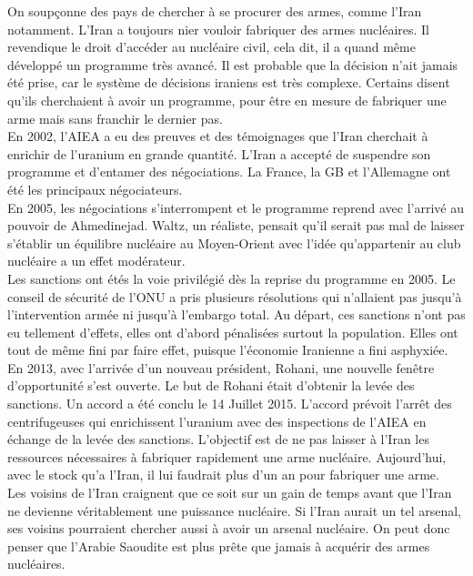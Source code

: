 \documentclass[10pt, a4paper, openany]{book}
\begin{document}
On soupçonne des pays de chercher à se procurer des armes, comme l'Iran notamment. L'Iran a toujours nier vouloir fabriquer des armes nucléaires. Il revendique le droit d'accéder au nucléaire civil, cela dit, il a quand même développé un programme très avancé. Il est probable que la décision n'ait jamais été prise, car le système de décisions iraniens est très complexe. Certains disent qu'ils cherchaient à avoir un programme, pour être en mesure de fabriquer une arme mais sans franchir le dernier pas. \\
En 2002, l'AIEA a eu des preuves et des témoignages que l'Iran cherchait à enrichir de l'uranium en grande quantité. L'Iran a accepté de suspendre son programme et d'entamer des négociations. La France, la GB et l'Allemagne ont été les principaux négociateurs. \\
En 2005, les négociations s'interrompent et le programme reprend avec l'arrivé au pouvoir de Ahmedinejad. Waltz, un réaliste, pensait qu'il serait pas mal de laisser s'établir un équilibre nucléaire au Moyen-Orient avec l'idée qu'appartenir au club nucléaire a un effet modérateur. \\
Les sanctions ont étés la voie privilégié dès la reprise du programme en 2005. Le conseil de sécurité de l'ONU a pris plusieurs résolutions qui n'allaient pas jusqu'à l'intervention armée ni jusqu'à l'embargo total. Au départ, ces sanctions n'ont pas eu tellement d'effets, elles ont d'abord pénalisées surtout la population. Elles ont tout de même fini par faire effet, puisque l'économie Iranienne a fini asphyxiée. \\
En 2013, avec l'arrivée d'un nouveau président, Rohani, une nouvelle fenêtre d'opportunité s'est ouverte. Le but de Rohani était d'obtenir la levée des sanctions. Un accord a été conclu le 14 Juillet 2015. L'accord prévoit l'arrêt des centrifugeuses qui enrichissent l'uranium avec des inspections de l'AIEA en échange de la levée des sanctions. L'objectif est de ne pas laisser à l'Iran les ressources nécessaires à fabriquer rapidement une arme nucléaire. Aujourd'hui, avec le stock qu'a l'Iran, il lui faudrait plus d'un an pour fabriquer une arme. \\
Les voisins de l'Iran craignent que ce soit sur un gain de temps avant que l'Iran ne devienne véritablement une puissance nucléaire. Si l'Iran aurait un tel arsenal, ses voisins pourraient chercher aussi à avoir un arsenal nucléaire. On peut donc penser que l'Arabie Saoudite est plus prête que jamais à acquérir des armes nucléaires. 
\end{document}
